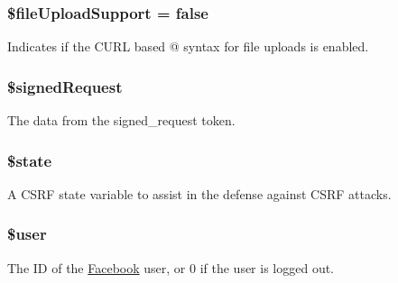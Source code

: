 \hypertarget{class_base_facebook_a06aa2734d6a181d46ea99b3122015d83}{
\subsubsection[{\$file\-Upload\-Support}]{\setlength{\rightskip}{0pt plus 5cm}\$file\-Upload\-Support = false\hspace{0.3cm}{\ttfamily [protected]}}}\label{class_base_facebook_a06aa2734d6a181d46ea99b3122015d83}
Indicates if the C\-U\-R\-L based @ syntax for file uploads is enabled. \hypertarget{class_base_facebook_a431a801575d1145d1a9621e7fd176ed9}{
\subsubsection[{\$signed\-Request}]{\setlength{\rightskip}{0pt plus 5cm}\$signed\-Request\hspace{0.3cm}{\ttfamily [protected]}}}\label{class_base_facebook_a431a801575d1145d1a9621e7fd176ed9}
The data from the signed\-\_\-request token. \hypertarget{class_base_facebook_ae82306c4f2d17d8dd5c7d8d916b33bed}{
\subsubsection[{\$state}]{\setlength{\rightskip}{0pt plus 5cm}\$state\hspace{0.3cm}{\ttfamily [protected]}}}\label{class_base_facebook_ae82306c4f2d17d8dd5c7d8d916b33bed}
A C\-S\-R\-F state variable to assist in the defense against C\-S\-R\-F attacks. \hypertarget{class_base_facebook_a598ca4e71b15a1313ec95f0df1027ca5}{
\subsubsection[{\$user}]{\setlength{\rightskip}{0pt plus 5cm}\$user\hspace{0.3cm}{\ttfamily [protected]}}}\label{class_base_facebook_a598ca4e71b15a1313ec95f0df1027ca5}
The I\-D of the \hyperlink{class_facebook}{Facebook} user, or 0 if the user is logged out. 

